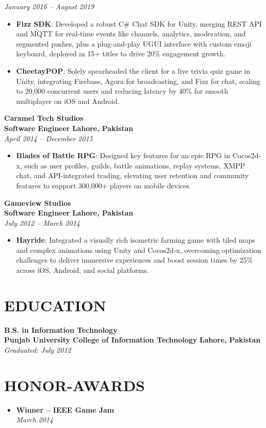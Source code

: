 \documentclass[11pt]{article}
\begin{document}
\textit{January 2016 – August 2019}
\begin{itemize}
	\item \textbf{Fizz SDK}: Developed a robust C\# Chat SDK for Unity, merging REST API and MQTT for real-time events like channels, analytics, moderation, and segmented pushes, plus a plug-and-play UGUI interface with custom emoji keyboard, deployed in 15+ titles to drive 20\% engagement growth.
    \newpage
	\item \textbf{CheetayPOP}: Solely spearheaded the client for a live trivia quiz game in Unity, integrating Firebase, Agora for broadcasting, and Fizz for chat, scaling to 20,000 concurrent users and reducing latency by 40\% for smooth multiplayer on iOS and Android.
\end{itemize}
\textbf{Caramel Tech Studios} \\
\textbf{Software Engineer} \hfill \textbf{Lahore, Pakistan} \\
\textit{April 2014 – December 2015}
\begin{itemize}
	\item \textbf{Blades of Battle RPG}: Designed key features for an epic RPG in Cocos2d-x, such as user profiles, guilds, battle animations, replay systems, XMPP chat, and API-integrated trading, elevating user retention and community features to support 300,000+ players on mobile devices.
\end{itemize}
\textbf{Gameview Studios} \\
\textbf{Software Engineer} \hfill \textbf{Lahore, Pakistan} \\
\textit{July 2012 – March 2014}
\begin{itemize}
	\item \textbf{Hayride}: Integrated a visually rich isometric farming game with tiled maps and complex animations using Unity and Cocos2d-x, overcoming optimization challenges to deliver immersive experiences and boost session times by 25\% across iOS, Android, and social platforms.
\end{itemize}

\section*{EDUCATION}
\textbf{B.S. in Information Technology}  \\ 
\textbf{Punjab University College of Information Technology} \hfill \textbf{Lahore, Pakistan}\\
\textit{Graduated: July 2012} 

\section*{HONOR-AWARDS}
\begin{itemize}
    \item \textbf{Winner -- IEEE Game Jam} \\
    \textit{March 2014}
\end{itemize}
\end{document}
